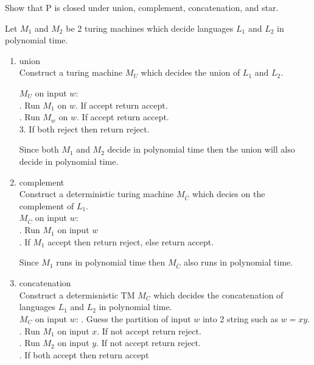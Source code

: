 \documentclass[12pt]{exam}
\begin{document}
\begin{questions}
\begin{solution}
\begin{enumerate}[a.]
  \end{enumerate}



\end{solution}


  \question{} %

  Show that P is closed under union, complement, concatenation, and star.

  \begin{solution}
    Let $M_{1}$ and $M_{2}$ be 2 turing machines which decide languages $L_{1}$ and $L_{2}$ in polynomial time.
    \begin{enumerate}
      \item union\\
            Construct a turing machine $M_{U}$ which decides the union of $L_{1}$ and $L_{2}$.

            $M_{U}$ on input $w$:\\
            \null {}. Run $M_{1}$ on $w$. If accept return accept.\\
            \null {}. Run $M_{w}$ on $w$. If accept return accept.\\
            3. If both reject then return reject.

            Since both $M_{1}$ and $M_{2}$ decide in polynomial time then the union will also decide in polynomial time.

      \item complement\\
            Construct a deterministic turing machine $M_{\bar C}$ which decies on the complement of $L_{1}$.\\

            $M_{\bar C}$ on input $w$:\\
            \null {}. Run $M_{1}$ on input $w$\\
            \null {}. If $M_{1}$ accept then return reject, else return accept.

            Since $M_{1}$ runs in polynomial time then $M_{\bar C}$ also runs in polynomial time.

      \item concatenation\\
            Construct a determisnistic TM $M_{C}$ which decides the concatenation of languages $L_{1}$ and $L_{2}$ in polynomial time.\\

            $M_{C}$ on input $w$:
            \null {}. Guess the partition of input $w$ into 2 string such as $w = xy$.\\
            \null {}. Run $M_{1}$ on input $x$. If not accept return reject.\\
            \null {}. Run $M_{2}$ on input $y$. If not accept return reject.\\
            \null {}. If both accept then return accept


\end{enumerate}
\end{solution}
\end{questions}
\end{document}
